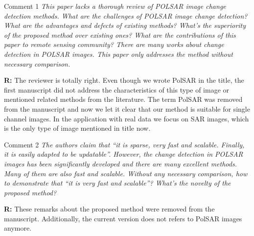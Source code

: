 \documentclass[11pt]{report}
\begin{document}
\medskip
\begin{mybox}{Comment 1}
\textit{This paper lacks a thorough review of POLSAR image change detection methods. What are the challenges of
POLSAR image change detection? What are the advantages and defects of existing methods? What’s the superiority of
the proposed method over existing ones? What are the contributions of this paper to remote sensing community? There
are many works about change detection in POLSAR images. This paper only addresses the method without necessary
comparison.}

\medskip

\textbf{R:} The reviewer is totally right. Even though we wrote PolSAR in the title, the first manuscript did not address the characteristics of this type of image or mentioned related methods from the literature. The term PolSAR was removed from the manuscript and now we let it clear that our method is suitable for single channel images. In the application with real data we focus on SAR images, which is the only type of image mentioned in title now.

\medskip


\end{mybox}

\vspace{0.3cm}

\medskip
\begin{mybox}{Comment 2}
\textit{The authors claim that “it is sparse, very fast and scalable. Finally, it is easily adapted to be updatable”. However, the
change detection in POLSAR images has been significantly developed and there are many excellent methods. Many of
them are also fast and scalable. Without any necessary comparison, how to demonstrate that “it is very fast and scalable”? What’s the novelty of the proposed method?}

\medskip

\textbf{R:} These remarks about the proposed method were removed from the manuscript. Additionally, the current version does not refers to PolSAR images anymore.

\medskip

\end{mybox}

\vspace{0.3cm}
\end{document}
